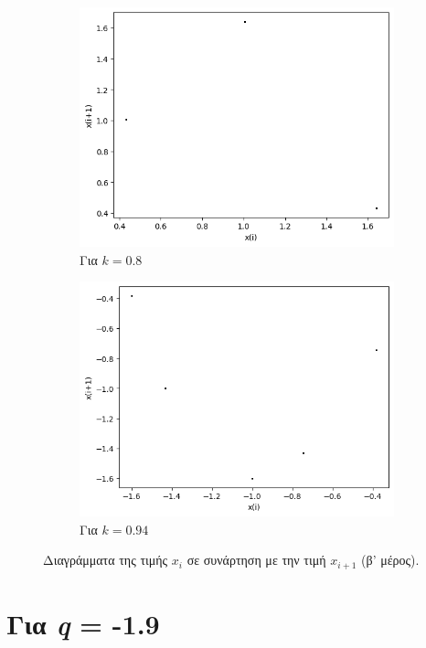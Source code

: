 \begin{figure}[ht]
\begin{subfigure}[b]{0.4\textwidth}
		\includegraphics[width=\textwidth]{LateX images/graphs q16/g19}
		\caption{Για $k=0.8$}
		\label{f:k90}
	\end{subfigure}
	\hfill
	\begin{subfigure}[b]{0.4\textwidth}
		\centering
		\includegraphics[width=\textwidth]{LateX images/graphs q16/g20}
		\caption{Για $k=0.94$}
		\label{f:k91}
	\end{subfigure}
	\hfill
	\caption{Διαγράμματα της τιμής \(x_i\) σε συνάρτηση με την τιμή \(x_{i+1}\) (β' μέρος).}
	\label{f:k241}
\end{figure}


\clearpage
\newpage

\section{Για \emph{q} = -1.9}

